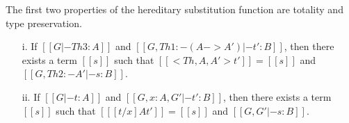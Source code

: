 The first two properties of the hereditary substitution function are
totality and type preservation.  
\begin{lemma}
  \label{lemma:totality_and_type_preservation}
  \begin{itemize}
  \item[i.] If $[[G |- Th 3 : A]]$ and $[[G, Th 1:{-(A->A')} |- t' : B]]$, then there
    exists a term $[[s]]$ such that $[[<Th,A,A'>t']] = [[s]]$ and $[[G, Th 2 :{-A'} |- s : B]]$.
  
  \item[ii.] If $[[G |- t : A]]$ and $[[G, x:A, G' |- t':B]]$, then there exists a term $[[s]]$ 
    such that $[[ [t/x] A t']] = [[s]]$ and $[[G,G' |- s:B]]$.
  \end{itemize}
\end{lemma}
